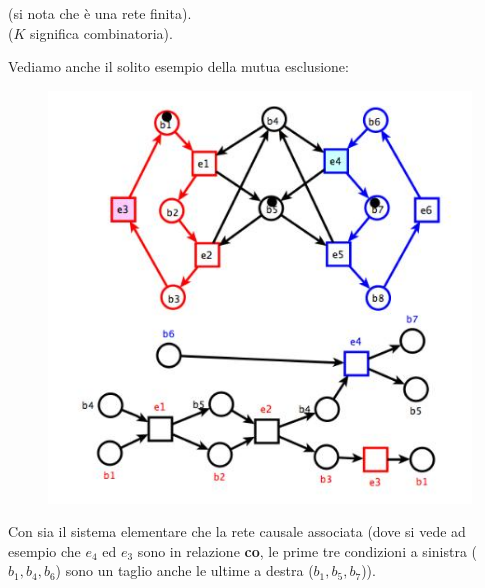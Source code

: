 \documentclass[a4paper,12pt, oneside]{book}
\begin{document}
\begin{definizione}
\begin{figure}[H]
  \end{figure}
  (si nota che è una rete finita).\\
  ($K$ significa combinatoria).
\end{definizione}
\begin{esempio}
  Vediamo anche il solito esempio della mutua esclusione:
  \begin{figure}[H]
    \centering
    \includegraphics[scale = 0.5]{img/de3.jpg} 
  \end{figure}
  Con sia il sistema elementare che la rete causale associata (dove si vede ad
  esempio che $e_4$ ed $e_3$ sono in relazione \textbf{co}, le prime tre
  condizioni a sinistra ($b_1,b_4,b_6$) sono un taglio anche le
  ultime a destra ($b_1,b_5,b_7$)). 
\end{esempio}
\end{document}

